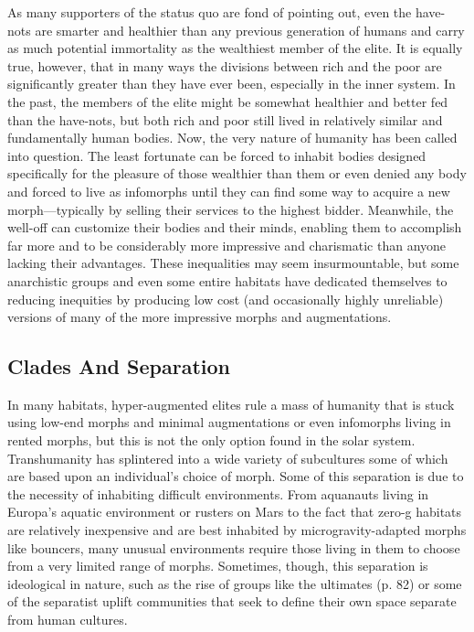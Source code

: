 As many supporters of the status quo 
are fond of pointing out, even the have-nots
are smarter and healthier than
any previous generation of humans and 
carry as much potential immortality as 
the wealthiest member of the elite. It is 
equally true, however, that in many ways 
the divisions between rich and the poor 
are significantly greater than they have 
ever been, especially in the inner system. 
In the past, the members of the elite 
might be somewhat healthier and better 
fed than the have-nots, but both rich and 
poor still lived in relatively similar and 
fundamentally human bodies. Now, the 
very nature of humanity has been called 
into question. The least fortunate can be 
forced to inhabit bodies designed specifically
for the pleasure of those wealthier
than them or even denied any body and 
forced to live as infomorphs until they 
can find some way to acquire a new 
morph—typically by selling their services 
to the highest bidder. Meanwhile, the 
well-off can customize their bodies and 
their minds, enabling them to accomplish 
far more and to be considerably more 
impressive and charismatic than anyone 
lacking their advantages. These inequalities
may seem insurmountable, but some
anarchistic groups and even some entire 
habitats have dedicated themselves to 
reducing inequities by producing low 
cost (and occasionally highly unreliable) 
versions of many of the more impressive 
morphs and augmentations.

\subsection{Clades And Separation}

In many habitats, hyper-augmented elites 
rule a mass of humanity that is stuck using 
low-end morphs and minimal augmentations
or even infomorphs living in rented
morphs, but this is not the only option 
found in the solar system. Transhumanity 
has splintered into a wide variety of subcultures
some of which are based upon an
individual's choice of morph. Some of this 
separation is due to the necessity of inhabiting
difficult environments. From aquanauts
living in Europa's aquatic environment or 
rusters on Mars to the fact that zero-g habitats
are relatively inexpensive and are best
inhabited by microgravity-adapted morphs 
like bouncers, many unusual environments 
require those living in them to choose from a very limited
range of morphs. Sometimes, though, this separation
is ideological in nature, such as the rise of groups like the 
ultimates (p. 82) or some of the separatist uplift communities
that seek to define their own space separate from
human cultures.

